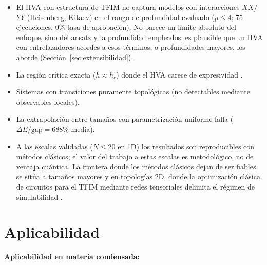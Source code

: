 \documentclass[11pt,a4paper,spanish]{book}
\begin{document}
\begin{itemize}
    \item El HVA con estructura de TFIM no captura modelos con interacciones $XX$/$YY$ (Heisenberg, Kitaev) en el rango de profundidad evaluado ($p \leq 4$; 75 ejecuciones, 0\% tasa de aprobación). No parece un límite absoluto del enfoque, sino del ansatz y la profundidad empleados: es plausible que un HVA con entrelazadores acordes a esos términos, o profundidades mayores, los aborde (Sección~\ref{sec:extensibilidad}).
    \item La región crítica exacta ($h \approx h_c$) donde el HVA carece de expresividad \citep{tripathi2026}.
    \item Sistemas con transiciones puramente topológicas (no detectables mediante observables locales).
    \item La extrapolación entre tamaños con parametrización uniforme falla ($\Delta E/\text{gap} = 688\%$ media).
    \item A las escalas validadas ($N \leq 20$ en 1D) los resultados son reproducibles con métodos clásicos; el valor del trabajo a estas escalas es metodológico, no de ventaja cuántica. La frontera donde los métodos clásicos dejan de ser fiables se sitúa a tamaños mayores y en topologías 2D, donde la optimización clásica de circuitos para el TFIM mediante redes tensoriales delimita el régimen de simulabilidad \citep{martin2026}.
\end{itemize}


\section{Aplicabilidad}
\label{sec:aplicabilidad}

\textbf{Aplicabilidad en materia condensada:}
\end{document}
